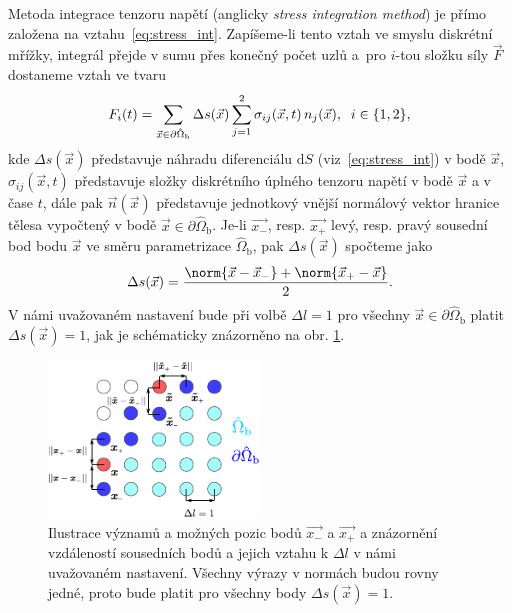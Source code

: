 Metoda integrace tenzoru napětí (anglicky \textit{stress integration method}) je přímo založena na vztahu~\eqref{eq:stress_int}. Zapíšeme-li tento vztah ve smyslu diskrétní mřížky, integrál přejde v sumu přes konečný počet uzlů a~pro $ i $-tou složku síly $ \vec{F} $ dostaneme vztah ve tvaru
\begin{equation}\label{eq:sim}
{F}_{i}(t) = \sum_{\vec{x} \in  \partial \hat{\Omega}_{\mathrm{b}}}^{} \Delta s(\vec{x}) \sum_{j=1}^{2}  \sigma_{ij} (\vec{x}, t) \, n_{j} (\vec{x})  , \hspace{2mm} i \in \{ 1, 2 \},
\end{equation}
kde $ \Delta s(\vec{x}) $ představuje náhradu diferenciálu $ \mathrm{d}S $ (viz~\eqref{eq:stress_int}) v bodě $ \vec{x}$, $ \sigma_{ij} (\vec{x}, t)$ představuje složky diskrétního úplného tenzoru napětí v bodě $ \vec{x} $ a v čase $ t $, dále pak $ \vec{n}(\vec{x}) $ představuje jednotkový vnější normálový vektor hranice tělesa vypočtený v bodě $ \vec{x} \in \partial \hat{\Omega}_{\mathrm{b}}$. Je-li $ \vec{x_{-}} $, resp. $  \vec{x_{+}} $ levý, resp. pravý sousední bod bodu $ \vec{x} $ ve směru parametrizace $ \hat{\Omega}_{\mathrm{b}} $, pak $ \Delta s(\vec{x}) $ spočteme jako
\begin{equation}
	 \Delta s(\vec{x}) = \frac{\norm{\vec{x}-\vec{x}_{-}} + \norm{\vec{x}_{+} - \vec{x}}}{2}.
\end{equation} 
V námi uvažovaném nastavení bude při volbě $ \Delta l = 1 $ pro všechny $ \vec{x} \in \partial \hat{\Omega}_{\mathrm{b}}$ platit $ \Delta s(\vec{x}) = 1 $, jak je schématicky znázorněno na obr. \ref{fig:deltas}.

\begin{figure}[h]
	\centering
	\includegraphics[width=0.5\textwidth, trim={0cm 0cm 0cm 0cm}]{Images/deltas.pdf}
	\vspace{3.8mm}
	\caption{Ilustrace významů a možných pozic bodů $ \vec{x_{-}} $ a $ \vec{x_{+}} $ a znázornění vzdáleností sousedních bodů a jejich vztahu k $ \Delta l $ v námi uvažovaném nastavení. Všechny výrazy v normách budou rovny jedné, proto bude platit pro všechny body $ \Delta s(\vec{x}) = 1 $.}
	\label{fig:deltas}
\end{figure}

